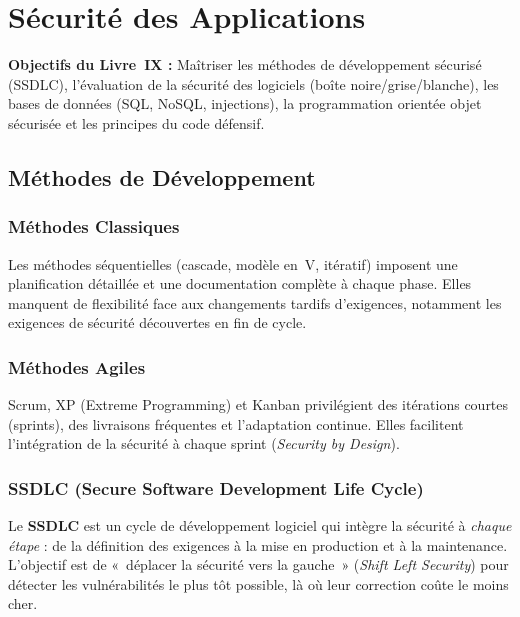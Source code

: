 
\chapter{Sécurité des Applications}
\label{chap:securite_apps}

\begin{boxobjectifs}
\textbf{Objectifs du Livre~IX :} Maîtriser les méthodes de développement sécurisé (SSDLC), l'évaluation de la sécurité des logiciels (boîte noire/grise/blanche), les bases de données (SQL, NoSQL, injections), la programmation orientée objet sécurisée et les principes du code défensif.
\end{boxobjectifs}

\section{Méthodes de Développement}

\subsection{Méthodes Classiques}
Les méthodes séquentielles (cascade, modèle en~V, itératif) imposent une planification détaillée et une documentation complète à chaque phase. Elles manquent de flexibilité face aux changements tardifs d'exigences, notamment les exigences de sécurité découvertes en fin de cycle.

\subsection{Méthodes Agiles}
Scrum, XP (Extreme Programming) et Kanban privilégient des itérations courtes (sprints), des livraisons fréquentes et l'adaptation continue. Elles facilitent l'intégration de la sécurité à chaque sprint (\textit{Security by Design}).

\subsection{SSDLC (Secure Software Development Life Cycle)}
\begin{boxdef}
Le \textbf{SSDLC} est un cycle de développement logiciel qui intègre la sécurité à \textit{chaque étape} : de la définition des exigences à la mise en production et à la maintenance. L'objectif est de «~déplacer la sécurité vers la gauche~» (\textit{Shift Left Security}) pour détecter les vulnérabilités le plus tôt possible, là où leur correction coûte le moins cher.
\end{boxdef}

